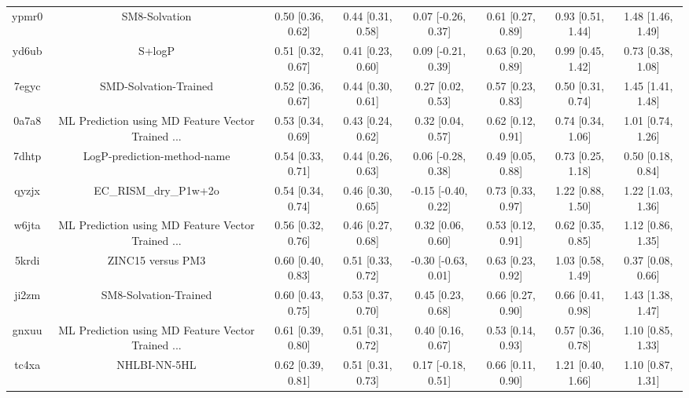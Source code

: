 \documentclass{article}
\begin{document}
\begin{center}
\begin{longtable}{|cccccccc|}
 ypmr0 &                                      SM8-Solvation &  0.50 [0.36, 0.62] &  0.44 [0.31, 0.58] &    0.07 [-0.26, 0.37] &  0.61 [0.27, 0.89] &    0.93 [0.51, 1.44] &     1.48 [1.46, 1.49] \\
 yd6ub &                                             S+logP &  0.51 [0.32, 0.67] &  0.41 [0.23, 0.60] &    0.09 [-0.21, 0.39] &  0.63 [0.20, 0.89] &    0.99 [0.45, 1.42] &     0.73 [0.38, 1.08] \\
 7egyc &                              SMD-Solvation-Trained &  0.52 [0.36, 0.67] &  0.44 [0.30, 0.61] &     0.27 [0.02, 0.53] &  0.57 [0.23, 0.83] &    0.50 [0.31, 0.74] &     1.45 [1.41, 1.48] \\
 0a7a8 &  ML Prediction using MD Feature Vector Trained ... &  0.53 [0.34, 0.69] &  0.43 [0.24, 0.62] &     0.32 [0.04, 0.57] &  0.62 [0.12, 0.91] &    0.74 [0.34, 1.06] &     1.01 [0.74, 1.26] \\
 7dhtp &                        LogP-prediction-method-name &  0.54 [0.33, 0.71] &  0.44 [0.26, 0.63] &    0.06 [-0.28, 0.38] &  0.49 [0.05, 0.88] &    0.73 [0.25, 1.18] &     0.50 [0.18, 0.84] \\
 qyzjx &                              EC\_RISM\_dry\_P1w+2o &  0.54 [0.34, 0.74] &  0.46 [0.30, 0.65] &   -0.15 [-0.40, 0.22] &  0.73 [0.33, 0.97] &    1.22 [0.88, 1.50] &     1.22 [1.03, 1.36] \\
 w6jta &  ML Prediction using MD Feature Vector Trained ... &  0.56 [0.32, 0.76] &  0.46 [0.27, 0.68] &     0.32 [0.06, 0.60] &  0.53 [0.12, 0.91] &    0.62 [0.35, 0.85] &     1.12 [0.86, 1.35] \\
 5krdi &                                  ZINC15 versus PM3 &  0.60 [0.40, 0.83] &  0.51 [0.33, 0.72] &   -0.30 [-0.63, 0.01] &  0.63 [0.23, 0.92] &    1.03 [0.58, 1.49] &     0.37 [0.08, 0.66] \\
 ji2zm &                              SM8-Solvation-Trained &  0.60 [0.43, 0.75] &  0.53 [0.37, 0.70] &     0.45 [0.23, 0.68] &  0.66 [0.27, 0.90] &    0.66 [0.41, 0.98] &     1.43 [1.38, 1.47] \\
 gnxuu &  ML Prediction using MD Feature Vector Trained ... &  0.61 [0.39, 0.80] &  0.51 [0.31, 0.72] &     0.40 [0.16, 0.67] &  0.53 [0.14, 0.93] &    0.57 [0.36, 0.78] &     1.10 [0.85, 1.33] \\
 tc4xa &                                       NHLBI-NN-5HL &  0.62 [0.39, 0.81] &  0.51 [0.31, 0.73] &    0.17 [-0.18, 0.51] &  0.66 [0.11, 0.90] &    1.21 [0.40, 1.66] &     1.10 [0.87, 1.31] \\

\end{longtable}
\end{center}
\end{document}
